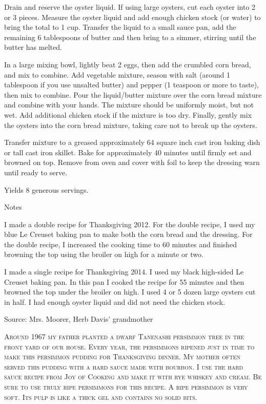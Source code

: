 \documentclass[letterpaper]{recipePMG}
\begin{document}
Drain and reserve the oyster liquid.  If using large oysters, cut each oyster
into 2 or 3 pieces.  Measure the oyster liquid and add enough chicken stock
(or water) to bring the total to 1 cup. Transfer the liquid to a small sauce pan, 
add the remaining 6 tablespoons of butter and then bring to a simmer, stirring until 
the butter has melted.

In a large mixing bowl, lightly beat 2 eggs, then add the crumbled corn bread,
and mix to combine.  Add vegetable mixture, season with salt (around 1 tablespoon
if you use unsalted butter) and pepper (1 teaspoon or more to taste), 
then mix to combine.  Pour the liquid/butter mixture over the corn bread 
mixture and combine with your hands.  The mixture should be
uniformly moist, but not wet. Add additional chicken stock if the mixture is too dry.
Finally, gently mix the oysters into the corn bread mixture, taking care not 
to break up the oysters.

Transfer mixture to a greased approximately 64 square inch cast iron baking dish
or tall cast iron skillet.  Bake for approximately 40 minutes until firmly set 
and browned on top.  Remove from oven and cover with foil to keep the dressing
warn until ready to serve.

Yields 8 generous servings.

Notes

I made a double recipe for Thanksgiving 2012.  
For the double recipe, I used my blue Le Creuset baking pan to make both the
corn bread and the dressing.  For the double recipe, I increased the
cooking time to 60 minutes and finished browning the top using the broiler
on high for a minute or two.

I made a single recipe for Thanksgiving 2014. I used my black high-sided Le Creuset baking pan. In this pan I cooked the recipe for 55 minutes and then browned the top under the broiler on high.  I used 4 or 5 dozen large oysters cut in half. I had enough oyster liquid and did not need the chicken stock.

Source: Mrs. Moorer, Herb Davis' grandmother

\newpage
{}
\label{PersimmonPudding}
\textsc{Around 1967 my father planted a dwarf Tanenashi
persimmon tree in the front yard of our house.  Every
year, the persimmons ripened just in time to make this persimmon pudding
for Thanksgiving dinner. My mother often served this pudding with
a hard sauce made with bourbon.  I use the hard sauce recipe from
Joy of Cooking and make it with rye whiskey and cream. Be sure to use
truly ripe persimmons for this recipe.  A ripe persimmon is very soft. Its pulp is
like a thick gel and contains no solid bits.}
\end{document}
